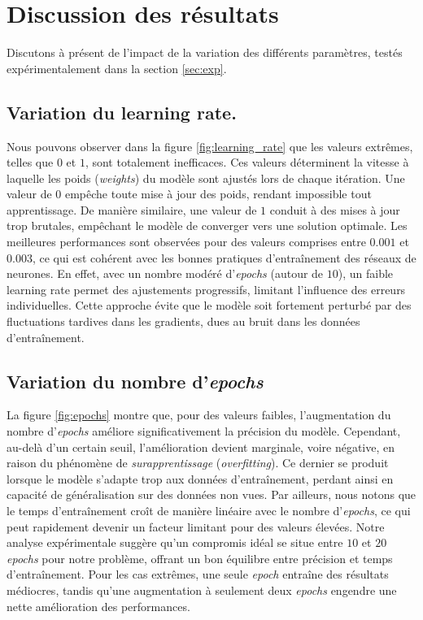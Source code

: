 \documentclass{article}
\begin{document}
\vspace{1em}


\section{Discussion des résultats}
\label{sec:disc}

\noindent Discutons à présent de l'impact de la variation des différents paramètres, testés expérimentalement dans la section \ref{sec:exp}.


\subsection{Variation du learning rate.}
\noindent Nous pouvons observer dans la figure \ref{fig:learning_rate} que les valeurs extrêmes, telles que $0$ et $1$, sont totalement inefficaces. Ces valeurs déterminent la vitesse à laquelle les poids (\textit{weights}) du modèle sont ajustés lors de chaque itération. Une valeur de $0$ empêche toute mise à jour des poids, rendant impossible tout apprentissage. De manière similaire, une valeur de $1$ conduit à des mises à jour trop brutales, empêchant le modèle de converger vers une solution optimale. Les meilleures performances sont observées pour des valeurs comprises entre $0.001$ et $0.003$, ce qui est cohérent avec les bonnes pratiques d'entraînement des réseaux de neurones. En effet, avec un nombre modéré d'\textit{epochs} (autour de $10$), un faible learning rate permet des ajustements progressifs, limitant l'influence des erreurs individuelles. Cette approche évite que le modèle soit fortement perturbé par des fluctuations tardives dans les gradients, dues au bruit dans les données d'entraînement.

\subsection{Variation du nombre d'\textit{epochs}} 
\noindent La figure \ref{fig:epochs} montre que, pour des valeurs faibles, l'augmentation du nombre d'\textit{epochs} améliore significativement la précision du modèle. Cependant, au-delà d'un certain seuil, l'amélioration devient marginale, voire négative, en raison du phénomène de \textit{surapprentissage} (\textit{overfitting}). Ce dernier se produit lorsque le modèle s'adapte trop aux données d'entraînement, perdant ainsi en capacité de généralisation sur des données non vues. Par ailleurs, nous notons que le temps d'entraînement croît de manière linéaire avec le nombre d'\textit{epochs}, ce qui peut rapidement devenir un facteur limitant pour des valeurs élevées. Notre analyse expérimentale suggère qu'un compromis idéal se situe entre $10$ et $20$ \textit{epochs} pour notre problème, offrant un bon équilibre entre précision et temps d'entraînement. Pour les cas extrêmes, une seule \textit{epoch} entraîne des résultats médiocres, tandis qu'une augmentation à seulement deux \textit{epochs} engendre une nette amélioration des performances.
\end{document}

